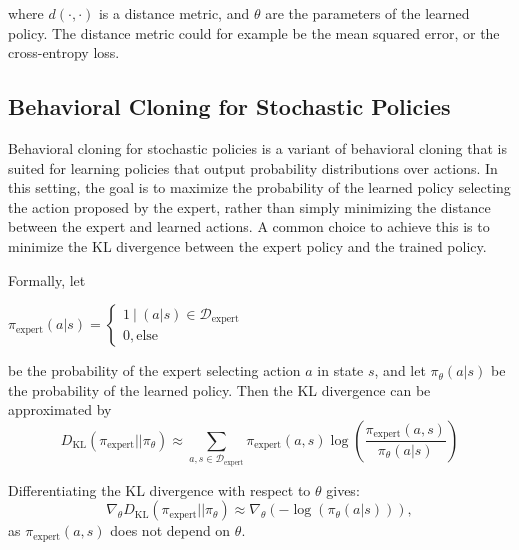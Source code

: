 where $d(\cdot, \cdot)$ is a distance metric, and $\theta$ are the parameters of the learned policy. The distance metric could for example be the mean 
squared error, or the cross-entropy loss.


\subsection{Behavioral Cloning for Stochastic Policies}
Behavioral cloning for stochastic policies is a variant of behavioral cloning that is suited for learning policies that output probability distributions over actions. In this setting, the goal is to maximize the probability of the learned policy selecting the action proposed by the expert, rather than simply minimizing the distance between the expert and learned actions. 
A common choice to achieve this is to minimize the KL divergence between the expert policy and the trained policy.

Formally, let 

\begin{center}
    $\pi_{\text{expert}}(a|s) = 
        \begin{cases}
            1 \ |\ (a|s)\in \mathcal{D}_{\text{expert}}\\
            0, \text{else}
        \end{cases}$
\end{center}

be the probability of the expert selecting action $a$ in state $s$, and let $\pi_{\theta}(a|s)$ be the probability of the learned policy. Then the KL divergence can be approximated by
\begin{equation}
    D_{\mathrm{KL}}(\pi_{\text{expert}} || \pi_{\theta}) \approx \sum_{a,s \in \mathcal{D}_{\text{expert}}} \pi_{\text{expert}}(a,s) \log\left(\frac{\pi_{\text{expert}}(a,s)}{\pi_{\theta}(a|s)}\right)
\end{equation}

Differentiating the KL divergence with respect to $\theta$ gives:
\begin{equation}
    \label{prob_imitation_learning}
    \nabla_{\theta} D_{\mathrm{KL}}(\pi_{\text{expert}} || \pi_{\theta}) \approx \nabla_{\theta} (-\log\left({\pi_{\theta}(a|s)}\right)),
\end{equation}
as $\pi_{\text{expert}}(a,s)$ does not depend on $\theta$.

